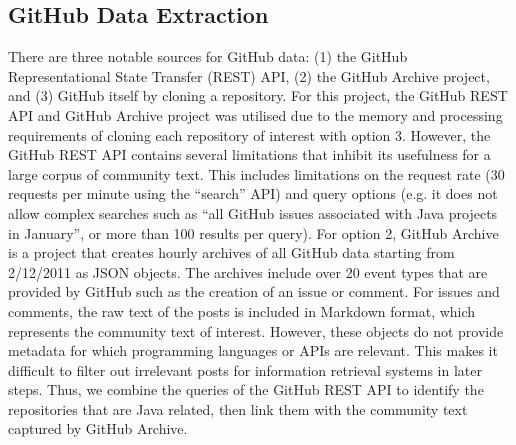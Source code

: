 \subsection{GitHub Data Extraction}
\label{subsec:info-github-extract}
There are three notable sources for GitHub data: (1) the GitHub Representational State Transfer (REST) API, (2) the GitHub Archive project, and (3) GitHub itself by cloning a repository. For this project, the GitHub REST API and GitHub Archive project was utilised due to the memory and processing requirements of cloning each repository of interest with option 3. However, the GitHub REST API contains several limitations that inhibit its usefulness for a large corpus of community text. This includes limitations on the request rate (30 requests per minute using the ``search'' API) and query options (e.g. it does not allow complex searches such as ``all GitHub issues associated with Java projects in January'', or more than 100 results per query). For option 2, GitHub Archive is a project that creates hourly archives of all GitHub data starting from 2/12/2011 as JSON objects. The archives include over 20 event types that are provided by GitHub such as the creation of an issue or comment. For issues and comments, the raw text of the posts is included in Markdown format, which represents the community text of interest.  However, these objects do not provide metadata for which programming languages or APIs are relevant. This makes it difficult to filter out irrelevant posts for information retrieval systems in later steps.
Thus, we combine the queries of the GitHub REST API to identify the repositories that are Java related, then link them with the community text captured by GitHub Archive.\\ 

